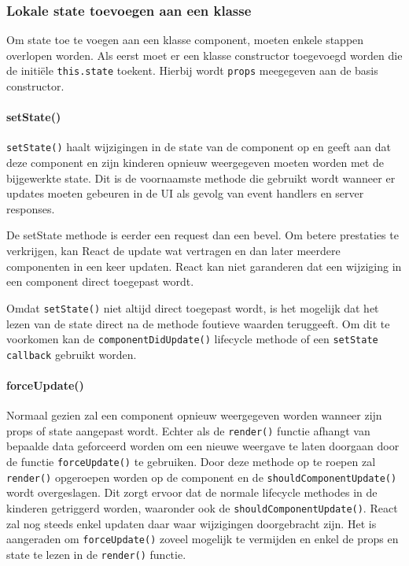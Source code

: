 \subsubsection{Lokale state toevoegen aan een klasse}

Om state toe te voegen aan een klasse component, moeten enkele stappen overlopen worden. Als eerst moet er een klasse constructor toegevoegd worden die de initiële \texttt{this.state} toekent. Hierbij wordt \texttt{props} meegegeven aan de basis constructor. \autocite{React2019c} %

\paragraph{setState()}

\texttt{setState()} haalt wijzigingen in de state van de component op en geeft aan dat deze component en zijn kinderen opnieuw weergegeven moeten worden met de bijgewerkte state. Dit is de voornaamste methode die gebruikt wordt wanneer er updates moeten gebeuren in de UI als gevolg van event handlers en server responses.  \autocite{React2019d}

De setState methode is eerder een request dan een bevel. Om betere prestaties te verkrijgen, kan React de update wat vertragen en dan later meerdere componenten in een keer updaten. React kan niet garanderen dat een wijziging in een component direct toegepast wordt. \autocite{React2019d}

Omdat \texttt{setState()} niet altijd direct toegepast wordt, is het mogelijk dat het lezen van de state direct na de methode foutieve waarden teruggeeft. Om dit te voorkomen kan de \texttt{componentDidUpdate()} lifecycle methode of een \texttt{setState callback} gebruikt worden. \autocite{React2019d} 

\paragraph{forceUpdate()}

Normaal gezien zal een component opnieuw weergegeven worden wanneer zijn props of state aangepast wordt. Echter als de \texttt{render()} functie afhangt van bepaalde data geforceerd worden om een nieuwe weergave te laten doorgaan door de functie \texttt{forceUpdate()} te gebruiken. Door deze methode op te roepen zal \texttt{render()} opgeroepen worden op de component en de \texttt{shouldComponentUpdate()} wordt overgeslagen. Dit zorgt ervoor dat de normale lifecycle methodes in de kinderen getriggerd worden, waaronder ook de \texttt{shouldComponentUpdate()}. React zal nog steeds enkel updaten daar waar wijzigingen doorgebracht zijn. Het is aangeraden om \texttt{forceUpdate()} zoveel mogelijk te vermijden en enkel de props en state te lezen in de \texttt{render()} functie. \autocite{React2019d}

